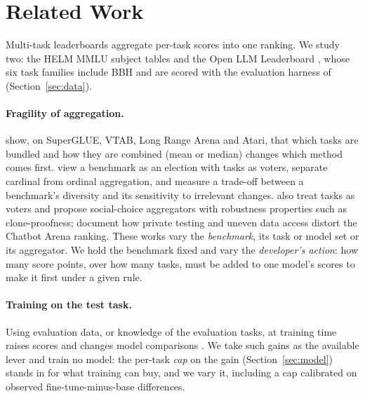 \section{Related Work}
\label{sec:related}

Multi-task leaderboards aggregate per-task scores into one ranking. We study two: the HELM MMLU subject tables \citep{liang2023helm,hendrycks2021mmlu} and the Open LLM Leaderboard \citep{ollb2025contents}, whose six task families include BBH \citep{suzgun2023bbh} and are scored with the evaluation harness of \citet{gao2023harness} (Section~\ref{sec:data}).

\paragraph{Fragility of aggregation.}
\citet{dehghani2021lottery} show, on SuperGLUE, VTAB, Long Range Arena and Atari, that which tasks are bundled and how they are combined (mean or median) changes which method comes first. \citet{zhang2024diversity} view a benchmark as an election with tasks as voters, separate cardinal from ordinal aggregation, and measure a trade-off between a benchmark's diversity and its sensitivity to irrelevant changes. \citet{lanctot2023social} also treat tasks as voters and propose social-choice aggregators with robustness properties such as clone-proofness; \citet{singh2025illusion} document how private testing and uneven data access distort the Chatbot Arena ranking. These works vary the \emph{benchmark}, its task or model set or its aggregator. We hold the benchmark fixed and vary the \emph{developer's action}: how many score points, over how many tasks, must be added to one model's scores to make it first under a given rule.

\paragraph{Training on the test task.}
Using evaluation data, or knowledge of the evaluation tasks, at training time raises scores and changes model comparisons \citep{zhou2023cheater,yang2023rephrased,dominguezolmedo2024ttt}. We take such gains as the available lever and train no model: the per-task \emph{cap} on the gain (Section~\ref{sec:model}) stands in for what training can buy, and we vary it, including a cap calibrated on observed fine-tune-minus-base differences.

